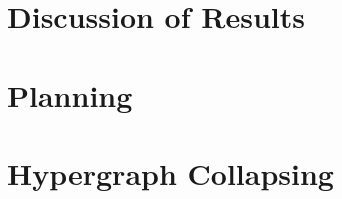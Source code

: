 \documentclass[Master.tex]{subfiles}
\begin{document}
\section{Discussion of Results}
    

\section{Planning}\label{sec:disc:planning}
    

\section{Hypergraph Collapsing}
    
\end{document}
